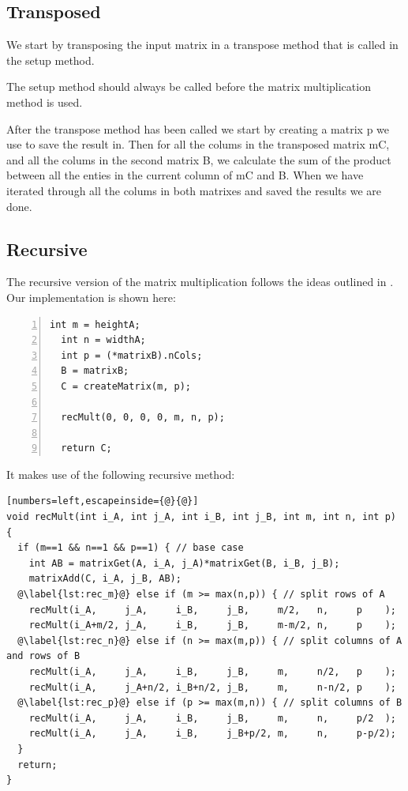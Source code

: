 \subsection{Transposed}

We start by transposing the input matrix in a transpose method that is called in the setup method.

The setup method should always be called before the matrix multiplication method is used.

After the transpose method has been called we start by creating a matrix p we use to save the result in.
Then for all the colums in the transposed matrix mC, and all the colums in the second matrix B, we calculate the sum of the product between all the enties in the current column of mC and B.
When we have iterated through all the colums in both matrixes and saved the results we are done.



\subsection{Recursive}
The recursive version of the matrix multiplication follows the ideas outlined in \citep{matrixMultiplication}.
Our implementation is shown here:
\begin{lstlisting}[numbers=left]
  int m = heightA;
  int n = widthA;
  int p = (*matrixB).nCols;
  B = matrixB;
  C = createMatrix(m, p);
  
  recMult(0, 0, 0, 0, m, n, p);
  
  return C;
\end{lstlisting}

It makes use of the following recursive method:
\begin{lstlisting}[numbers=left,escapeinside={@}{@}]
void recMult(int i_A, int j_A, int i_B, int j_B, int m, int n, int p) {
  if (m==1 && n==1 && p==1) { // base case
    int AB = matrixGet(A, i_A, j_A)*matrixGet(B, i_B, j_B);
    matrixAdd(C, i_A, j_B, AB);
  @\label{lst:rec_m}@} else if (m >= max(n,p)) { // split rows of A
    recMult(i_A,     j_A,     i_B,     j_B,     m/2,   n,     p    );
    recMult(i_A+m/2, j_A,     i_B,     j_B,     m-m/2, n,     p    );
  @\label{lst:rec_n}@} else if (n >= max(m,p)) { // split columns of A and rows of B
    recMult(i_A,     j_A,     i_B,     j_B,     m,     n/2,   p    );
    recMult(i_A,     j_A+n/2, i_B+n/2, j_B,     m,     n-n/2, p    );
  @\label{lst:rec_p}@} else if (p >= max(m,n)) { // split columns of B
    recMult(i_A,     j_A,     i_B,     j_B,     m,     n,     p/2  );
    recMult(i_A,     j_A,     i_B,     j_B+p/2, m,     n,     p-p/2);
  }
  return;
}
\end{lstlisting}

